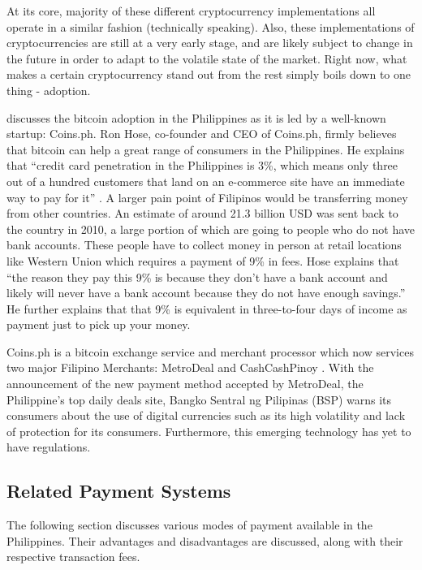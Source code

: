 \documentclass{acm_proc_article-sp}
\begin{document}
At its core, majority of these different cryptocurrency implementations all operate in a similar fashion (technically speaking). Also, these implementations of cryptocurrencies are still at a very early stage, and are likely subject to change in the future in order to adapt to the volatile state of the market. Right now, what makes a certain cryptocurrency stand out from the rest simply boils down to one thing - adoption.

\cite{Coins.ph:06292014} discusses the bitcoin adoption in the Philippines as it is led by a well-known startup: Coins.ph. Ron Hose, co-founder and CEO of Coins.ph, firmly believes that bitcoin can help a great range of consumers in the Philippines. He explains that ``credit card penetration in the Philippines is 3\%, which means only three out of a hundred customers that land on an e-commerce site have an immediate way to pay for it'' \cite{Coins.ph:06292014}. A larger pain point of Filipinos would be transferring money from other countries. An estimate of around 21.3 billion USD was sent back to the country in 2010, a large portion of which are going to people who do not have bank accounts. These people have to collect money in person at retail locations like Western Union which requires a payment of 9\% in fees. Hose explains that ``the reason they pay this 9\% is because they don't have a bank account and likely will never have a bank account because they do not have enough savings.'' He further explains that that 9\% is equivalent in three-to-four days of income as payment just to pick up your money.

Coins.ph is a bitcoin exchange service and merchant processor which now services two major Filipino Merchants: MetroDeal and CashCashPinoy \cite{Coins.ph:03202014}. With the announcement of the new payment method accepted by MetroDeal, the Philippine's top daily deals site, Bangko Sentral ng Pilipinas (BSP) warns its consumers about the use of digital currencies such as its high volatility and lack of protection for its consumers. Furthermore, this emerging technology has yet to have regulations.

\subsection{Related Payment Systems}
The following section discusses various modes of payment available in the Philippines. Their advantages and disadvantages are discussed, along with their respective transaction fees.
\end{document}
